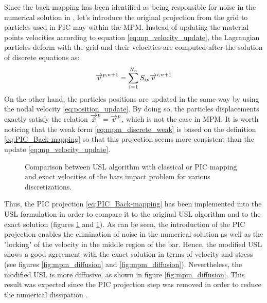 Since the back-mapping has been identified as being responsible for noise in the numerical solution in \cite{Mass_Flip}, let's introduce the original projection from the grid to particles used in PIC may within the MPM. Instead of updating the material points velocities according to equation \eqref{eq:mp_velocity_update}, the Lagrangian particles deform with the grid and their velocities are computed after the solution of discrete equations as:
\begin{equation}
  \label{eq:PIC_Back-mapping}
  {\overrightarrow{v}}^{p,n+1}=\sum_{i=1}^{N_n} S_{ip}{\overrightarrow{v}}^{i,n+1}
\end{equation}
On the other hand, the particles positions are updated in the same way by using the nodal velocity \eqref{eq:position_update}. By doing so, the particles displacements exactly satisfy the relation ${\overrightarrow{\dot{x}}}^p={\overrightarrow{v}}^p$, which is not the case in MPM. It is worth noticing that the weak form \eqref{eq:mpm_discrete_weak} is based on the definition \eqref{eq:PIC_Back-mapping} so that this projection seems more consistent than the update \eqref{eq:mp_velocity_update}. 
\begin{figure}[h!]
  \centering
  { \label{subfig:MPM_velo_10}}
  { \label{subfig:MPM_velo_25}}
  \caption{Comparison between USL algorithm with classical or PIC mapping and exact velocities of the bars impact problem for various discretizations.}
  \label{fig:MPM_velocities}
\end{figure}
Thus, the PIC projection \eqref{eq:PIC_Back-mapping} has been implemented into the USL formulation in order to compare it to the original USL algorithm and to the exact solution (figures \ref{fig:MPM_velocities} and \ref{fig:MPM_velocities}). As can be seen, the introduction of the PIC projection enables the elimination of noise in the numerical solution as well as the "locking" of the velocity in the middle region of the bar. Hence, the modified USL shows a good agreement with the exact solution in terms of velocity and stress (see figures \ref{fig:mpm_diffusion} and \ref{fig:mpm_diffusion}). Nevertheless, the modified USL is more diffusive, as shown in figure \ref{fig:mpm_diffusion}. This result was expected since the PIC projection step was removed in order to reduce the numerical dissipation \cite{PIC_Nishiguchi}. 
